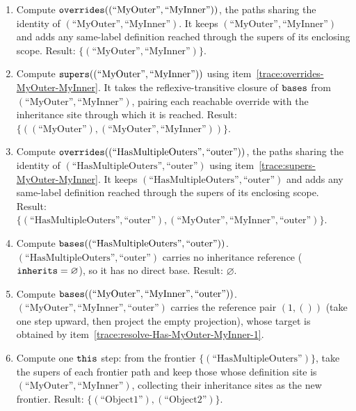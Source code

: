 \begin{enumerate}
  \item \label{trace:overrides-MyOuter-MyInner}Compute $\mathtt{overrides}((\text{``MyOuter''}, \text{``MyInner''}))$, the paths sharing the identity of $(\text{``MyOuter''}, \text{``MyInner''})$. It keeps $(\text{``MyOuter''}, \text{``MyInner''})$ and adds any same-label definition reached through the supers of its enclosing scope. Result: $\{(\text{``MyOuter''}, \text{``MyInner''})\}$.
  \item \label{trace:supers-MyOuter-MyInner}Compute $\mathtt{supers}((\text{``MyOuter''}, \text{``MyInner''}))$ using item~\ref{trace:overrides-MyOuter-MyInner}. It takes the reflexive-transitive closure of $\mathtt{bases}$ from $(\text{``MyOuter''}, \text{``MyInner''})$, pairing each reachable override with the inheritance site through which it is reached. Result: $\{((\text{``MyOuter''}), (\text{``MyOuter''}, \text{``MyInner''}))\}$.
  \item \label{trace:overrides-Has-outer}Compute $\mathtt{overrides}((\text{``HasMultipleOuters''}, \text{``outer''}))$, the paths sharing the identity of $(\text{``HasMultipleOuters''}, \text{``outer''})$ using item~\ref{trace:supers-MyOuter-MyInner}. It keeps $(\text{``HasMultipleOuters''}, \text{``outer''})$ and adds any same-label definition reached through the supers of its enclosing scope. Result: $\{(\text{``HasMultipleOuters''}, \text{``outer''}), (\text{``MyOuter''}, \text{``MyInner''}, \text{``outer''})\}$.
  \item \label{trace:bases-Has-outer}Compute $\mathtt{bases}((\text{``HasMultipleOuters''}, \text{``outer''}))$. $(\text{``HasMultipleOuters''}, \text{``outer''})$ carries no inheritance reference ($\mathtt{inherits} = \varnothing$), so it has no direct base. Result: $\varnothing$.
  \item \label{trace:bases-MyOuter-MyInner-outer}Compute $\mathtt{bases}((\text{``MyOuter''}, \text{``MyInner''}, \text{``outer''}))$. $(\text{``MyOuter''}, \text{``MyInner''}, \text{``outer''})$ carries the reference pair $(1, ())$ (take one step upward, then project the empty projection), whose target is obtained by item~\ref{trace:resolve-Has-MyOuter-MyInner-1}.
  \item \label{trace:this-Has-MyOuter-MyInner-1}Compute one $\mathtt{this}$ step: from the frontier $\{(\text{``HasMultipleOuters''})\}$, take the supers of each frontier path and keep those whose definition site is $(\text{``MyOuter''}, \text{``MyInner''})$, collecting their inheritance sites as the new frontier. Result: $\{(\text{``Object1''}), (\text{``Object2''})\}$.

\end{enumerate}
